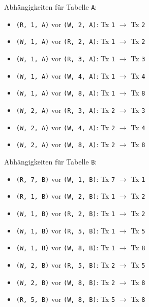 \documentclass[a4paper,11pt]{report}
\begin{document}
Abhängigkeiten für Tabelle \texttt{A}:

\begin{itemize}
    \item \texttt{(R, 1, A)} vor \texttt{(W, 2, A)}: Tx \texttt{1} $\rightarrow$ Tx \texttt{2}
    \item \texttt{(W, 1, A)} vor \texttt{(R, 2, A)}: Tx \texttt{1} $\rightarrow$ Tx \texttt{2}
    \item \texttt{(W, 1, A)} vor \texttt{(R, 3, A)}: Tx \texttt{1} $\rightarrow$ Tx \texttt{3}
    \item \texttt{(W, 1, A)} vor \texttt{(W, 4, A)}: Tx \texttt{1} $\rightarrow$ Tx \texttt{4}
    \item \texttt{(W, 1, A)} vor \texttt{(W, 8, A)}: Tx \texttt{1} $\rightarrow$ Tx \texttt{8}
    \item \texttt{(W, 2, A)} vor \texttt{(R, 3, A)}: Tx \texttt{2} $\rightarrow$ Tx \texttt{3}
    \item \texttt{(W, 2, A)} vor \texttt{(W, 4, A)}: Tx \texttt{2} $\rightarrow$ Tx \texttt{4}
    \item \texttt{(W, 2, A)} vor \texttt{(W, 8, A)}: Tx \texttt{2} $\rightarrow$ Tx \texttt{8}
\end{itemize}

Abhängigkeiten für Tabelle \texttt{B}:

\begin{itemize}
    \item \texttt{(R, 7, B)} vor \texttt{(W, 1, B)}: Tx \texttt{7} $\rightarrow$ Tx \texttt{1}
    \item \texttt{(R, 1, B)} vor \texttt{(W, 2, B)}: Tx \texttt{1} $\rightarrow$ Tx \texttt{2}
    \item \texttt{(W, 1, B)} vor \texttt{(R, 2, B)}: Tx \texttt{1} $\rightarrow$ Tx \texttt{2}
    \item \texttt{(W, 1, B)} vor \texttt{(R, 5, B)}: Tx \texttt{1} $\rightarrow$ Tx \texttt{5}
    \item \texttt{(W, 1, B)} vor \texttt{(W, 8, B)}: Tx \texttt{1} $\rightarrow$ Tx \texttt{8}
    \item \texttt{(W, 2, B)} vor \texttt{(R, 5, B)}: Tx \texttt{2} $\rightarrow$ Tx \texttt{5}
    \item \texttt{(W, 2, B)} vor \texttt{(W, 8, B)}: Tx \texttt{2} $\rightarrow$ Tx \texttt{8}
    \item \texttt{(R, 5, B)} vor \texttt{(W, 8, B)}: Tx \texttt{5} $\rightarrow$ Tx \texttt{8}
\end{itemize}
\end{document}
